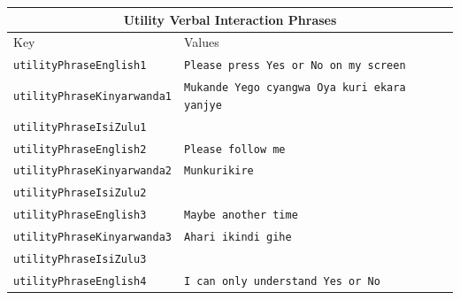\documentclass{CSSRforAfrica}
\begin{document}
\clearpage
 



\begin{table}[H]
\begin{center}
\begin{tabular}{|l l l|}
\hline \hline
\multicolumn{3}{|c|}{{\small \bf  Utility Verbal Interaction Phrases}} \\
\hline \hline
 {\small  Key  }                                         &  {\small Values }   &      \\
\hline
{\footnotesize \verb+utilityPhraseEnglish1+}             & {\footnotesize \verb+Please press Yes or No on my screen+}\vspace{-1mm} & {\footnotesize  } \\
{\footnotesize \verb+utilityPhraseKinyarwanda1+}     & {\footnotesize \verb+Mukande Yego cyangwa Oya kuri ekara yanjye+}\vspace{-1mm} & {\footnotesize  } \\
{\footnotesize \verb+utilityPhraseIsiZulu1+}              & {\footnotesize \verb++}\vspace{-1mm} & {\footnotesize  } \\
{\footnotesize \verb+utilityPhraseEnglish2+}             & {\footnotesize \verb+Please follow me+}\vspace{-1mm} & {\footnotesize  } \\
{\footnotesize \verb+utilityPhraseKinyarwanda2+}     & {\footnotesize \verb+Munkurikire+}\vspace{-1mm} & {\footnotesize  } \\
{\footnotesize \verb+utilityPhraseIsiZulu2+}              & {\footnotesize \verb++}\vspace{-1mm} & {\footnotesize  } \\
{\footnotesize \verb+utilityPhraseEnglish3+}             & {\footnotesize \verb+Maybe another time+}\vspace{-1mm} & {\footnotesize  } \\
{\footnotesize \verb+utilityPhraseKinyarwanda3+}     & {\footnotesize \verb+Ahari ikindi gihe+}\vspace{-1mm} & {\footnotesize  } \\
{\footnotesize \verb+utilityPhraseIsiZulu3+}              & {\footnotesize \verb++}\vspace{-1mm} & {\footnotesize  } \\
{\footnotesize \verb+utilityPhraseEnglish4+}             & {\footnotesize \verb+I can only understand Yes or No+}\vspace{-1mm} & {\footnotesize  } \\

\end{tabular}
\end{center}
\end{table}
\end{document}
